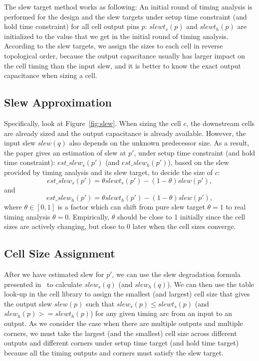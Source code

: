 The slew target method works as following: An initial round of timing analysis is performed for the design and the slew targets under setup time constraint (and hold time constraint) for all cell output pins $p$: $slewt_s(p)$ and $slewt_h(p)$ are initialized to the value that we get in the initial round of timing analysis. According to the slew targets, we assign the sizes to each cell in reverse topological order, because the output capacitance usually has larger impact on the cell timing than the input slew, and it is better to know the exact output capacitance when sizing a cell.

\subsection{Slew Approximation}
Specifically, look at Figure~\ref{fig:slew}. When sizing the cell $c$, the downstream cells are already sized and the output capacitance is already available. However, the input slew $slew(q)$ also depends on the unknown predecessor size. As a result, the paper gives an estimation of slew at $p'$, under setup time constraint (and hold time constraint): $est\_slew_s(p')$ (and $est\_slew_h(p')$), based on the slew provided by timing analysis and its slew target, to decide the size of $c$:
\begin{equation}
est\_slew_s(p') = \theta slewt_s(p') - (1-\theta)slew(p'),
\end{equation}
and
\begin{equation}
est\_slew_h(p') = \theta slewt_h(p') - (1-\theta)slew(p'),
\end{equation}
where $\theta \in [0, 1]$ is a factor which can shift from pure slew target $\theta = 1$ to real timing analysis $\theta = 0$. Empirically, $\theta$ should be close to 1 initially since the cell sizes are actively changing, but close to 0 later when the cell sizes converge.

\subsection{Cell Size Assignment}
After we have estimated slew for $p'$, we can use the slew degradation formula presented in~\cite{TAU:Contest} to calculate $slew_s(q)$ (and $slew_h(q)$). We can then use the table look-up in the cell library to assign the smallest (and largest) cell size that gives the output slew $slew(p)$ such that $slew_s(p) \leq slewt_s(p)$ (and $slew_h(p) >= slewt_h(p)$) for any given timing arc from an input to an output. As we consider the case when there are multiple outputs and multiple corners, we must take the largest (and the smallest) cell size across different outputs and different corners under setup time target (and hold time target) because all the timing outputs and corners must satisfy the slew target.

